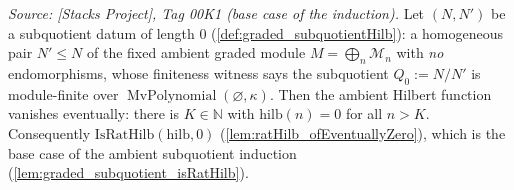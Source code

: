 \begin{lemma}\leanok
  \label{lem:graded_subquotient_base_eventuallyZero}
  \textit{Source: [Stacks Project], Tag 00K1 (base case of the induction).}
  Let \((N, N')\) be a subquotient datum of length \(0\)
  (\cref{def:graded_subquotientHilb}): a homogeneous pair \(N' \le N\) of the fixed
  ambient graded module \(M = \bigoplus_n \mathcal{M}_n\) with \emph{no} endomorphisms,
  whose finiteness witness says the subquotient \(Q_0 := N/N'\) is module-finite over
  \(\operatorname{MvPolynomial}(\varnothing, \kappa)\). Then the ambient Hilbert
  function vanishes eventually: there is \(K \in \mathbb{N}\) with
  \(\mathrm{hilb}(n) = 0\) for all \(n > K\). Consequently
  \(\mathrm{IsRatHilb}(\mathrm{hilb}, 0)\) (\cref{lem:ratHilb_ofEventuallyZero}),
  which is the base case of the ambient subquotient induction
  (\cref{lem:graded_subquotient_isRatHilb}).
\end{lemma}

